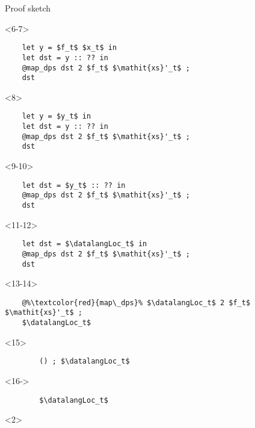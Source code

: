 \begin{frame}[fragile]{Proof sketch}
\begin{minipage}{.4\columnwidth}
    \begin{onlyenv}<6-7>
        \begin{lstlisting}
    let y = $f_t$ $x_t$ in
    let dst = y :: ?? in
    @map_dps dst 2 $f_t$ $\mathit{xs}'_t$ ;
    dst
        \end{lstlisting}
    \end{onlyenv}
    \begin{onlyenv}<8>
        \begin{lstlisting}
    let y = $y_t$ in
    let dst = y :: ?? in
    @map_dps dst 2 $f_t$ $\mathit{xs}'_t$ ;
    dst
        \end{lstlisting}
    \end{onlyenv}
    \begin{onlyenv}<9-10>
        \begin{lstlisting}
    let dst = $y_t$ :: ?? in
    @map_dps dst 2 $f_t$ $\mathit{xs}'_t$ ;
    dst
        \end{lstlisting}
    \end{onlyenv}
    \begin{onlyenv}<11-12>
        \begin{lstlisting}
    let dst = $\datalangLoc_t$ in
    @map_dps dst 2 $f_t$ $\mathit{xs}'_t$ ;
    dst
        \end{lstlisting}
    \end{onlyenv}
    \begin{onlyenv}<13-14>
        \begin{lstlisting}
    @%\textcolor{red}{map\_dps}% $\datalangLoc_t$ 2 $f_t$ $\mathit{xs}'_t$ ;
    $\datalangLoc_t$
        \end{lstlisting}
    \end{onlyenv}
    \begin{onlyenv}<15>
        \begin{lstlisting}
        () ; $\datalangLoc_t$
        \end{lstlisting}
    \end{onlyenv}
    \begin{onlyenv}<16->
        \begin{lstlisting}
        $\datalangLoc_t$
        \end{lstlisting}
    \end{onlyenv}
\end{minipage}
\begin{overbox}<2>
    \begin{mathpar}
\end{mathpar}
\end{overbox}
\end{frame}
